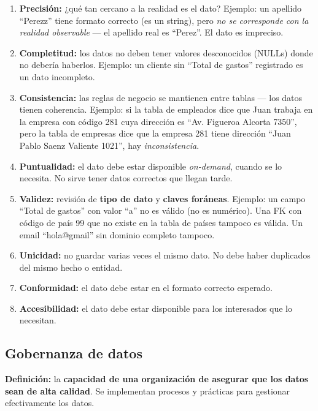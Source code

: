 \documentclass[11pt, a4paper]{article}
\begin{document}
\begin{enumerate}
	\item \textbf{Precisión:} ¿qué tan cercano a la realidad es el dato? Ejemplo: un apellido ``Perezz'' tiene formato correcto (es un string), pero \textit{no se corresponde con la realidad observable} --- el apellido real es ``Perez''. El dato es impreciso.

	\item \textbf{Completitud:} los datos no deben tener valores desconocidos (NULLs) donde no debería haberlos. Ejemplo: un cliente sin ``Total de gastos'' registrado es un dato incompleto.

	\item \textbf{Consistencia:} las reglas de negocio se mantienen entre tablas --- los datos tienen coherencia. Ejemplo: si la tabla de empleados dice que Juan trabaja en la empresa con código 281 cuya dirección es ``Av. Figueroa Alcorta 7350'', pero la tabla de empresas dice que la empresa 281 tiene dirección ``Juan Pablo Saenz Valiente 1021'', hay \textit{inconsistencia}.

	\item \textbf{Puntualidad:} el dato debe estar disponible \textit{on-demand}, cuando se lo necesita. No sirve tener datos correctos que llegan tarde.

	\item \textbf{Validez:} revisión de \textbf{tipo de dato} y \textbf{claves foráneas}. Ejemplo: un campo ``Total de gastos'' con valor ``a'' no es válido (no es numérico). Una FK con código de país 99 que no existe en la tabla de países tampoco es válida. Un email ``hola@gmail'' sin dominio completo tampoco.

	\item \textbf{Unicidad:} no guardar varias veces el mismo dato. No debe haber duplicados del mismo hecho o entidad.

	\item \textbf{Conformidad:} el dato debe estar en el formato correcto esperado.

	\item \textbf{Accesibilidad:} el dato debe estar disponible para los interesados que lo necesitan.
\end{enumerate}

\subsection{Gobernanza de datos}

\textbf{Definición:} la \textbf{capacidad de una organización de asegurar que los datos sean de alta calidad}. Se implementan procesos y prácticas para gestionar efectivamente los datos.
\end{document}
